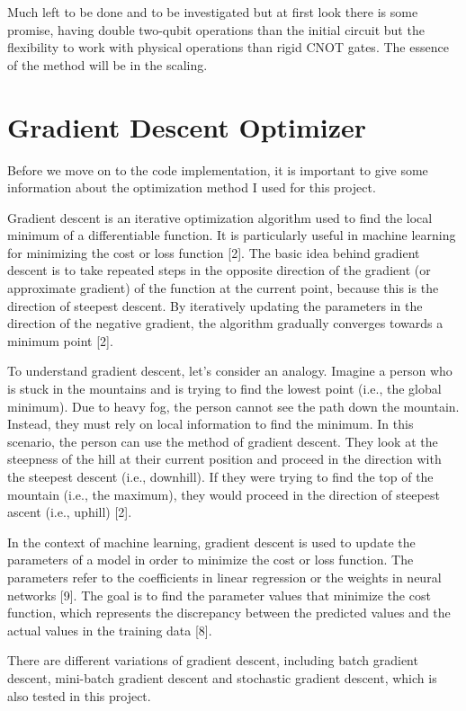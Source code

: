 \documentclass[inscr,ack,preface]{diphdthesis}
\begin{document}
Much left to be done and to be investigated but at first look there is some promise, having double two-qubit operations
than the initial circuit but the flexibility to work with physical operations than rigid CNOT gates.
The essence of the method will be in the scaling.


\section{Gradient Descent Optimizer}

Before we move on to the code implementation, it is important to give some information about the optimization method I used for this project. 

Gradient descent is an iterative optimization algorithm used to find the local minimum of a differentiable function. It is particularly useful in machine learning for minimizing the cost or loss function [2]. The basic idea behind gradient descent is to take repeated steps in the opposite direction of the gradient (or approximate gradient) of the function at the current point, because this is the direction of steepest descent. By iteratively updating the parameters in the direction of the negative gradient, the algorithm gradually converges towards a minimum point [2].

To understand gradient descent, let's consider an analogy. Imagine a person who is stuck in the mountains and is trying to find the lowest point (i.e., the global minimum). Due to heavy fog, the person cannot see the path down the mountain. Instead, they must rely on local information to find the minimum. In this scenario, the person can use the method of gradient descent. They look at the steepness of the hill at their current position and proceed in the direction with the steepest descent (i.e., downhill). If they were trying to find the top of the mountain (i.e., the maximum), they would proceed in the direction of steepest ascent (i.e., uphill) [2].

In the context of machine learning, gradient descent is used to update the parameters of a model in order to minimize the cost or loss function. The parameters refer to the coefficients in linear regression or the weights in neural networks [9]. The goal is to find the parameter values that minimize the cost function, which represents the discrepancy between the predicted values and the actual values in the training data [8].

There are different variations of gradient descent, including batch gradient descent, mini-batch gradient descent and stochastic gradient descent, which is also tested in this project.
\end{document}
